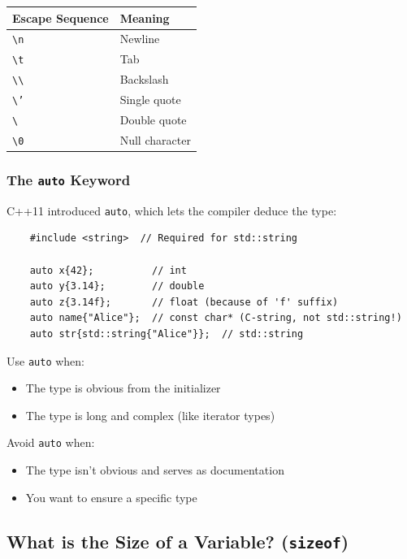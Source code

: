\begin{center}
	\begin{tabular}{|l|l|}
		\hline
		\textbf{Escape Sequence} & \textbf{Meaning} \\
		\hline
		\texttt{\textbackslash{}n} & Newline \\
		\texttt{\textbackslash{}t} & Tab \\
		\texttt{\textbackslash{}\textbackslash{}} & Backslash \\
		\texttt{\textbackslash{}'} & Single quote \\
		\texttt{\textbackslash{}\textquotedbl} & Double quote \\
		\texttt{\textbackslash{}0} & Null character \\
		\hline
	\end{tabular}
\end{center}

\subsubsection{The \texttt{auto} Keyword}

C++11 introduced \texttt{auto}, which lets the compiler deduce the type:

\begin{lstlisting}
	#include <string>  // Required for std::string

	auto x{42};          // int
	auto y{3.14};        // double
	auto z{3.14f};       // float (because of 'f' suffix)
	auto name{"Alice"};  // const char* (C-string, not std::string!)
	auto str{std::string{"Alice"}};  // std::string
\end{lstlisting}

\begin{remark}
	Use \texttt{auto} when:
	\begin{itemize}
		\item The type is obvious from the initializer
		\item The type is long and complex (like iterator types)
	\end{itemize}
	
	Avoid \texttt{auto} when:
	\begin{itemize}
		\item The type isn't obvious and serves as documentation
		\item You want to ensure a specific type
	\end{itemize}
\end{remark}

\subsection{What is the Size of a Variable? (\texttt{sizeof})}

